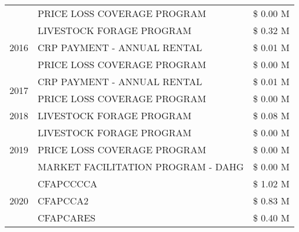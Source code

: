 \begin{tabular}{llr}
 & PRICE LOSS COVERAGE PROGRAM & \$ 0.00 M \\
\cline{1-3}
\multirow[t]{3}{*}{2016} & LIVESTOCK FORAGE PROGRAM & \$ 0.32 M \\
 & CRP PAYMENT - ANNUAL RENTAL & \$ 0.01 M \\
 & PRICE LOSS COVERAGE PROGRAM & \$ 0.00 M \\
\cline{1-3}
\multirow[t]{2}{*}{2017} & CRP PAYMENT - ANNUAL RENTAL & \$ 0.01 M \\
 & PRICE LOSS COVERAGE PROGRAM & \$ 0.00 M \\
\cline{1-3}
2018 & LIVESTOCK FORAGE PROGRAM & \$ 0.08 M \\
\cline{1-3}
\multirow[t]{3}{*}{2019} & LIVESTOCK FORAGE PROGRAM & \$ 0.00 M \\
 & PRICE LOSS COVERAGE PROGRAM & \$ 0.00 M \\
 & MARKET FACILITATION PROGRAM - DAHG & \$ 0.00 M \\
\cline{1-3}
\multirow[t]{3}{*}{2020} & CFAPCCCCA & \$ 1.02 M \\
 & CFAPCCA2 & \$ 0.83 M \\
 & CFAPCARES & \$ 0.40 M \\
\cline{1-3}
\bottomrule
\end{tabular}
